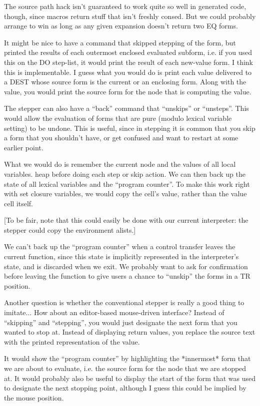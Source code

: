The source path hack isn't guaranteed to work quite so well in generated code,
though, since macros return stuff that isn't freshly consed.  But we could
probably arrange to win as long as any given expansion doesn't return two EQ
forms.

It might be nice to have a command that skipped stepping of the form, but
printed the results of each outermost enclosed evaluated subform, i.e. if you
used this on the DO step-list, it would print the result of each new-value
form.  I think this is implementable.  I guess what you would do is print each
value delivered to a DEST whose source form is the current or an enclosing
form.  Along with the value, you would print the source form for the node that
is computing the value.

The stepper can also have a ``back'' command that ``unskips'' or ``unsteps''.  This
would allow the evaluation of forms that are pure (modulo lexical variable
setting) to be undone.  This is useful, since in stepping it is common that you
skip a form that you shouldn't have, or get confused and want to restart at
some earlier point.

What we would do is remember the current node and the values of all local
variables.  heap before doing each step or skip action.  We can then back up
the state of all lexical variables and the ``program counter''.  To make this
work right with set closure variables, we would copy the cell's value, rather
than the value cell itself.

[To be fair, note that this could easily be done with our current interpreter:
the stepper could copy the environment alists.]

We can't back up the ``program counter'' when a control transfer leaves the
current function, since this state is implicitly represented in the
interpreter's state, and is discarded when we exit.  We probably want to ask
for confirmation before leaving the function to give users a chance to ``unskip''
the forms in a TR position.

Another question is whether the conventional stepper is really a good thing to
imitate...  How about an editor-based mouse-driven interface?  Instead of
``skipping'' and ``stepping'', you would just designate the next form that you
wanted to stop at.  Instead of displaying return values, you replace the source
text with the printed representation of the value.

It would show the ``program counter'' by highlighting the *innermost* form that
we are about to evaluate, i.e. the source form for the node that we are stopped
at.  It would probably also be useful to display the start of the form that was
used to designate the next stopping point, although I guess this could be
implied by the mouse position.


